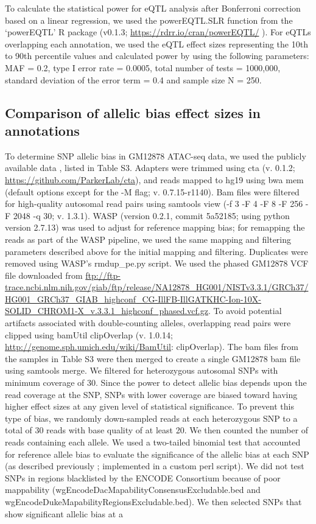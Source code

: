 To calculate the statistical power for eQTL analysis after Bonferroni correction based on a linear regression, we used the powerEQTL.SLR function from the ‘powerEQTL’ R package \cite{dongPowerEQTLPowerSample2017} (v0.1.3; \url{https://rdrr.io/cran/powerEQTL/} ). For eQTLs overlapping each annotation, we used the eQTL effect sizes representing the 10th to 90th percentile values and calculated power by using the following parameters: MAF = 0.2, type I error rate = 0.0005, total number of tests = 1000,000, standard deviation of the error term = 0.4 and sample size N = 250.

\subsection{Comparison of allelic bias effect sizes in annotations}
To determine SNP allelic bias in GM12878 ATAC-seq data, we used the publicly available data \cite{buenrostroTranspositionNativeChromatin2013}, listed in Table S3. Adapters were trimmed using cta (v. 0.1.2; \url{https://github.com/ParkerLab/cta}), and reads mapped to hg19 using bwa mem \cite{liAligningSequenceReads2013} (default options except for the -M flag; v. 0.7.15-r1140). Bam files were filtered for high-quality autosomal read pairs using samtools \cite{liSequenceAlignmentMap2009} view (-f 3 -F 4 -F 8 -F 256 -F 2048 -q 30; v. 1.3.1). WASP \cite{geijnWASPAllelespecificSoftware2015} (version 0.2.1, commit 5a52185; using python version 2.7.13) was used to adjust for reference mapping bias; for remapping the reads as part of the WASP pipeline, we used the same mapping and filtering parameters described above for the initial mapping and filtering. Duplicates were removed using WASP’s rmdup_pe.py script. We used the phased GM12878 VCF file downloaded from \url{ftp://ftp-trace.ncbi.nlm.nih.gov/giab/ftp/release/NA12878_HG001/NISTv3.3.1/GRCh37/HG001_GRCh37_GIAB_highconf_CG-IllFB-IllGATKHC-Ion-10X-SOLID_CHROM1-X_v.3.3.1_highconf_phased.vcf.gz}. To avoid potential artifacts associated with double-counting alleles, overlapping read pairs were clipped using bamUtil clipOverlap (v. 1.0.14; \url{http://genome.sph.umich.edu/wiki/BamUtil}: clipOverlap). The bam files from the samples in Table S3 were then merged to create a single GM12878 bam file using samtools merge. We filtered for heterozygous autosomal SNPs with minimum coverage of 30. Since the power to detect allelic bias depends upon the read coverage at the SNP, SNPs with lower coverage are biased toward having higher effect sizes at any given level of statistical significance. To prevent this type of bias, we randomly down-sampled reads at each heterozygous SNP to a total of 30 reads with base quality of at least 20. We then counted the number of reads containing each allele. We used a two-tailed binomial test that accounted for reference allele bias to evaluate the significance of the allelic bias at each SNP (as described previously \cite{varshneyGeneticRegulatorySignatures2017}; implemented in a custom perl script). We did not test SNPs in regions blacklisted by the ENCODE Consortium because of poor mappability (wgEncodeDacMapabilityConsensusExcludable.bed and wgEncodeDukeMapabilityRegionsExcludable.bed). We then selected SNPs that show significant allelic bias at a 
